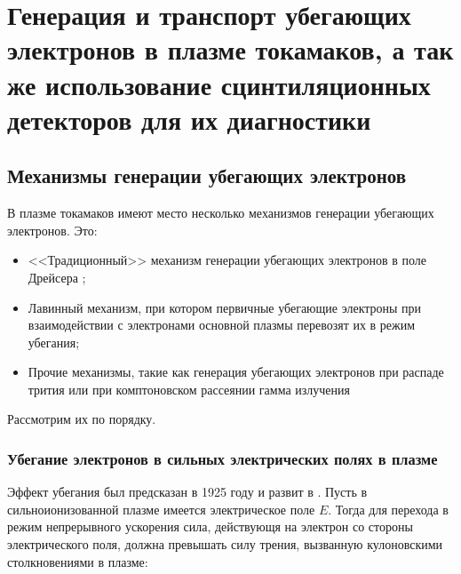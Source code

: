 \chapter{Генерация и транспорт убегающих электронов в плазме токамаков, а так же использование сцинтиляционных детекторов для их диагностики}\label{ch:ch1}

\section{Механизмы генерации убегающих электронов}\label{sec:ch1/sec1}

В плазме токамаков имеют место несколько механизмов генерации убегающих электронов. Это:

\begin{itemize}
  \item <<Традиционный>> механизм генерации убегающих электронов в поле Дрейсера \cite{Golant1977,Dreicer1959};
  \item Лавинный механизм, при котором первичные убегающие электроны при взаимодействии с электронами основной плазмы перевозят их в режим убегания;
  \item Прочие механизмы, такие как генерация убегающих электронов при распаде трития или при комптоновском рассеянии гамма излучения 
\end{itemize}

Рассмотрим их по порядку.

\subsection{Убегание электронов в сильных электрических полях в плазме}

Эффект убегания был предсказан в 1925 году \cite{Wilson1925} и развит в \cite{Dreicer1959}. Пусть в сильноионизованной плазме имеется электрическое поле $E$. Тогда для перехода в режим непрерывного ускорения сила, действующя на электрон со стороны электрического поля, должна превышать силу трения, вызванную кулоновскими столкновениями в плазме:

